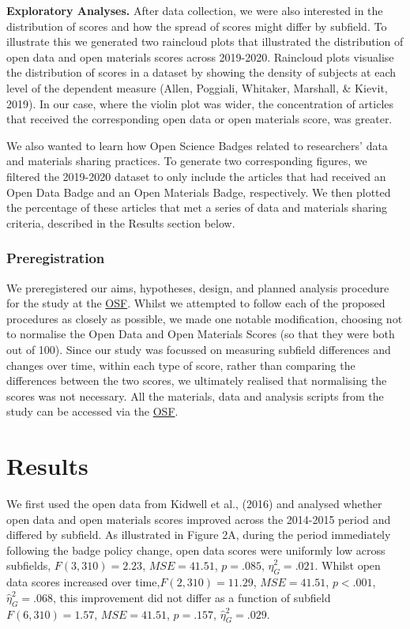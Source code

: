 \documentclass[
  english,
  man,floatsintext]{apa6}
\begin{document}
\textbf{Exploratory Analyses.} After data collection, we were also interested in the distribution of scores and how the spread of scores might differ by subfield. To illustrate this we generated two raincloud plots that illustrated the distribution of open data and open materials scores across 2019-2020. Raincloud plots visualise the distribution of scores in a dataset by showing the density of subjects at each level of the dependent measure (Allen, Poggiali, Whitaker, Marshall, \& Kievit, 2019). In our case, where the violin plot was wider, the concentration of articles that received the corresponding open data or open materials score, was greater.

We also wanted to learn how Open Science Badges related to researchers' data and materials sharing practices. To generate two corresponding figures, we filtered the 2019-2020 dataset to only include the articles that had received an Open Data Badge and an Open Materials Badge, respectively. We then plotted the percentage of these articles that met a series of data and materials sharing criteria, described in the Results section below.

\hypertarget{preregistration}{%
\subsubsection{Preregistration}\label{preregistration}}

We preregistered our aims, hypotheses, design, and planned analysis procedure for the study at the \href{https://osf.io/gqv9n/?view_only=b97cd4c4f6d645bc9e8870d97b6f3da4}{OSF}. Whilst we attempted to follow each of the proposed procedures as closely as possible, we made one notable modification, choosing not to normalise the Open Data and Open Materials Scores (so that they were both out of 100). Since our study was focussed on measuring subfield differences and changes over time, within each type of score, rather than comparing the differences between the two scores, we ultimately realised that normalising the scores was not necessary. All the materials, data and analysis scripts from the study can be accessed via the \href{https://osf.io/z8b7j/?view_only=b97cd4c4f6d645bc9e8870d97b6f3da4}{OSF}.

\hypertarget{results}{%
\section{Results}\label{results}}

We first used the open data from Kidwell et al., (2016) and analysed whether open data and open materials scores improved across the 2014-2015 period and differed by subfield. As illustrated in Figure 2A, during the period immediately following the badge policy change, open data scores were uniformly low across subfields, \(F(3, 310) = 2.23\), \(\mathit{MSE} = 41.51\), \(p = .085\), \(\hat{\eta}^2_G = .021\). Whilst open data scores increased over time,\(F(2, 310) = 11.29\), \(\mathit{MSE} = 41.51\), \(p < .001\), \(\hat{\eta}^2_G = .068\), this improvement did not differ as a function of subfield \(F(6, 310) = 1.57\), \(\mathit{MSE} = 41.51\), \(p = .157\), \(\hat{\eta}^2_G = .029\).
\end{document}
